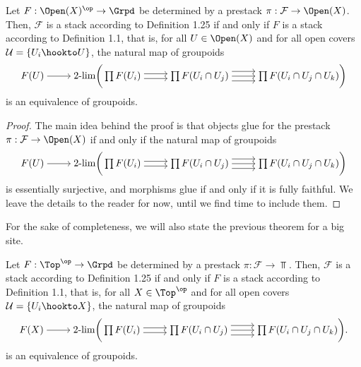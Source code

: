\begin{theorem}
    Let \( F: \Open(X)^\op \to \Grpd \) be determined by a prestack \( \pi: \mathcal{F} \to \Open(X) \). Then, \( \mathcal{F} \) is a stack according to Definition 1.25 if and only if $F$ is a stack according to Definition 1.1, that is, for all \( U \in \Open(X) \) and for all open covers \( \mathcal{U} = \{ U_i \hookto U \} \), the natural map of groupoids
    \[\begin{tikzcd}[cramped]
        {F(U)} & {\text{2-lim} \bigg( \prod F(U_i)} & {\prod F(U_i \cap U_j)} & {\prod F(U_i \cap U_j \cap U_k) \bigg)}
        \arrow[from=1-1, to=1-2]
        \arrow[shift right, from=1-2, to=1-3]
        \arrow[shift left, from=1-2, to=1-3]
        \arrow[from=1-3, to=1-4]
        \arrow[shift left=2, from=1-3, to=1-4]
        \arrow[shift right=2, from=1-3, to=1-4]
    \end{tikzcd}\]
    is an equivalence of groupoids.
\end{theorem}
\begin{proof}
    The main idea behind the proof is that objects glue for the prestack $\pi: \mathcal{F} \to \Open(X)$ if and only if the natural map of groupoids 
    \[\begin{tikzcd}[cramped]
        {F(U)} & {\text{2-lim} \bigg( \prod F(U_i)} & {\prod F(U_i \cap U_j)} & {\prod F(U_i \cap U_j \cap U_k) \bigg)}
        \arrow[from=1-1, to=1-2]
        \arrow[shift right, from=1-2, to=1-3]
        \arrow[shift left, from=1-2, to=1-3]
        \arrow[from=1-3, to=1-4]
        \arrow[shift left=2, from=1-3, to=1-4]
        \arrow[shift right=2, from=1-3, to=1-4]
    \end{tikzcd}\]
    is essentially surjective, and morphisms glue if and only if it is fully faithful. We leave the details to the reader for now, until we find time to include them.
\end{proof}

\begin{remark}
    For the sake of completeness, we will also state the previous theorem for a big site.
\end{remark}

\begin{theorem}\label{thm:twoDefsAgree}
    Let \( F: \Top^\op \to \Grpd \) be determined by a prestack \( \pi: \mathcal{F} \to \Top \). Then, \( \mathcal{F} \) is a stack according to Definition 1.25 if and only if $F$ is a stack according to Definition 1.1, that is, for all \( X \in \Top^\op \) and for all open covers \( \mathcal{U} = \{ U_i \hookto X \} \), the natural map of groupoids
    \[\begin{tikzcd}[cramped]
        {F(X)} & {\text{2-lim} \bigg( \prod F(U_i)} & {\prod F(U_i \cap U_j)} & {\prod F(U_i \cap U_j \cap U_k) \bigg).}
        \arrow[from=1-1, to=1-2]
        \arrow[shift right, from=1-2, to=1-3]
        \arrow[shift left, from=1-2, to=1-3]
        \arrow[from=1-3, to=1-4]
        \arrow[shift left=2, from=1-3, to=1-4]
        \arrow[shift right=2, from=1-3, to=1-4]
    \end{tikzcd}\]
    is an equivalence of groupoids.
\end{theorem}

